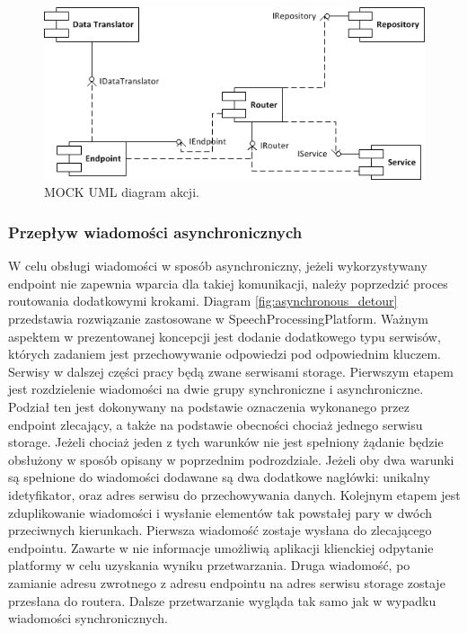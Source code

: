 \begin{figure}[!h]
	\centering
	\includegraphics[scale=1.0]{component_uml.png}
	\caption{MOCK UML diagram akcji. }\label{fig:action_diagram}
\end{figure}

\subsubsection{Przepływ wiadomości asynchronicznych}
W celu obsługi wiadomości w sposób asynchroniczny, jeżeli wykorzystywany endpoint nie zapewnia wparcia dla takiej komunikacji, należy poprzedzić proces routowania dodatkowymi krokami.
Diagram \ref{fig:asynchronous_detour} przedstawia rozwiązanie zastosowane w SpeechProcessingPlatform. Ważnym aspektem w prezentowanej koncepcji jest dodanie dodatkowego typu serwisów, których zadaniem jest przechowywanie odpowiedzi pod odpowiednim kluczem. Serwisy w dalszej części pracy będą zwane serwisami storage. Pierwszym etapem jest rozdzielenie wiadomości na dwie grupy synchroniczne i asynchroniczne. Podział ten jest dokonywany na podstawie oznaczenia wykonanego przez endpoint zlecający, a także na podstawie obecności chociaż jednego serwisu storage. Jeżeli chociaż jeden z tych warunków nie jest spełniony żądanie będzie obsłużony w sposób opisany w poprzednim podrozdziale. Jeżeli oby dwa warunki są spełnione do wiadomości dodawane są dwa dodatkowe nagłówki: unikalny idetyfikator, oraz adres serwisu do przechowywania danych. Kolejnym etapem jest zduplikowanie wiadomości i wysłanie elementów tak powstałej pary w dwóch przeciwnych kierunkach. Pierwsza wiadomość zostaje wysłana do zlecającego endpointu. Zawarte w nie informacje umożliwią aplikacji klienckiej odpytanie platformy w celu uzyskania wyniku przetwarzania. Druga wiadomość, po zamianie adresu zwrotnego z adresu endpointu na adres serwisu storage zostaje przesłana do routera. Dalsze przetwarzanie wygląda tak samo jak w wypadku wiadomości synchronicznych.

